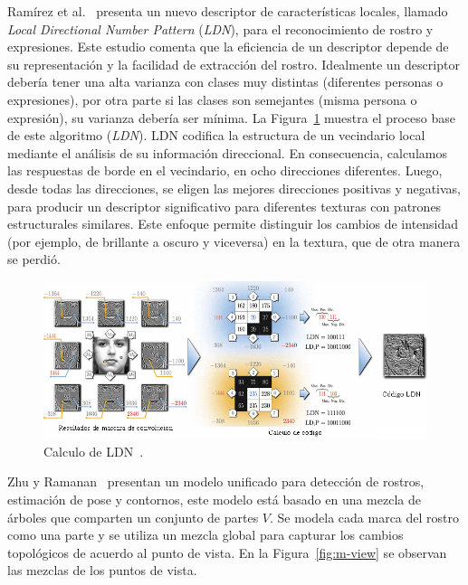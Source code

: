 Ramírez et al.~\cite{ldnp2013} presenta un nuevo descriptor de características locales, llamado \textit{Local Directional Number Pattern} (\textit{LDN}), para el reconocimiento de rostro y expresiones. Este estudio comenta que la eficiencia de un descriptor depende de su representación y la facilidad de extracción del rostro. Idealmente un descriptor debería tener una alta varianza con clases muy distintas (diferentes personas o expresiones), por otra parte si las clases son semejantes (misma persona o expresión), su varianza debería ser mínima. La Figura~\ref{fig:ldn} muestra el proceso base de este algoritmo (\textit{LDN}). LDN codifica la estructura de un vecindario local mediante el análisis de su información direccional. En consecuencia, calculamos las respuestas de borde en el vecindario, en ocho direcciones diferentes. Luego, desde todas las direcciones, se eligen las mejores direcciones positivas y negativas, para producir un descriptor significativo para diferentes texturas con patrones estructurales similares. Este enfoque permite distinguir los cambios de intensidad (por ejemplo, de brillante a oscuro y viceversa) en la textura, que de otra manera se perdió.

\begin{figure}[tb]
 \centering
  \includegraphics[width=1\textwidth]{Figuras/ldn.jpg}
  \caption[Calculo de LDN]{Calculo de LDN~\cite{ldnp2013}.}
  \label{fig:ldn}
\end{figure}

Zhu y Ramanan~\cite{Zhu2012} presentan un modelo unificado para detección de rostros, estimación de pose y contornos, este modelo está basado en una mezcla de árboles que comparten un conjunto de partes $V$. Se modela cada marca del rostro como una parte y se utiliza un mezcla global para capturar los cambios topológicos de acuerdo al punto de vista. En la Figura~\ref{fig:m-view} se observan las mezclas de los puntos de vista.

